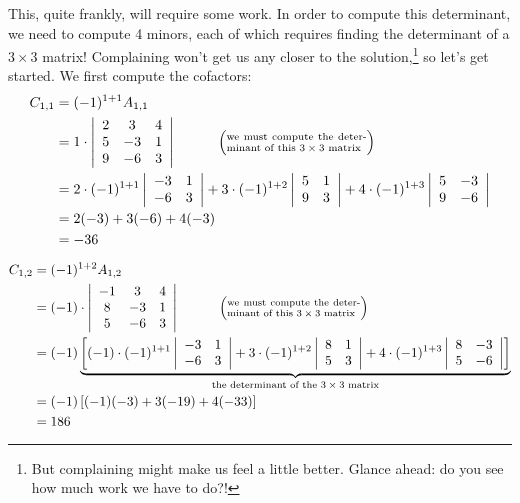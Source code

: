 {This, quite frankly, will require some work. In order to compute this determinant, we need to compute 4 minors, each of which requires finding the determinant of a $3\times 3$ matrix! Complaining won't get us any closer to the solution,\footnote{But complaining might make us feel a little better. Glance ahead: do you see how much work we have to do?!} so let's get started. We first compute the cofactors:
\begin{align*}C_{1,1} &= (-1)^{1+1}\tta_{1,1}\\
	&= 1\cdot\bdt{ccc}2&3&4\\5&-3&1\\9&-6&3\edt \quad\quad\quad \left(\parbox{100pt}{\scriptsize we must compute the determinant of this $3\times 3$ matrix}\right)\\
	&= 2\cdot(-1)^{1+1}\bdt{cc}-3&1\\-6&3\edt + 3\cdot(-1)^{1+2}\bdt{cc}5&1\\9&3\edt + 4\cdot(-1)^{1+3}\bdt{cc}5&-3\\9&-6\edt \\
	&= 2(-3) + 3(-6) + 4(-3)\\
	&= -36
\end{align*}

\begin{align*}C_{1,2} &= (-1)^{1+2}\tta_{1,2}\\
	&= (-1)\cdot\bdt{ccc}-1&3&4\\8&-3&1\\5&-6&3\edt \quad\quad\quad \left(\parbox{100pt}{\scriptsize we must compute the determinant of this $3\times 3$ matrix}\right)\\
	&= (-1)\underbrace{\left[(-1)\cdot(-1)^{1+1}\bdt{cc}-3&1\\-6&3\edt + 3\cdot(-1)^{1+2}\bdt{cc}8&1\\5&3\edt + 4\cdot(-1)^{1+3}\bdt{cc}8&-3\\5&-6\edt \right]}_{\parbox{150pt}{\centering\scriptsize the determinant of the $3 \times 3$ matrix}} \\
	&= (-1)\left[(-1)(-3)+3(-19)+4(-33) \right]\\
	&= 186
\end{align*}

\drawexampleline%

}
